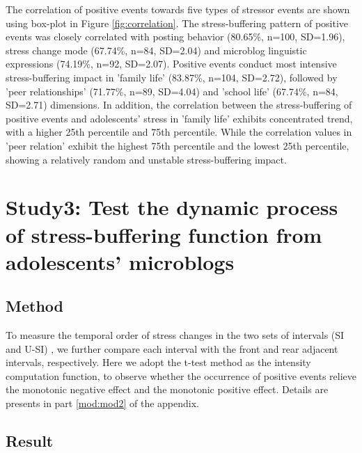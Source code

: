 The correlation of positive events towards five types of stressor events
are shown using box-plot in Figure \ref{fig:correlation}.
The stress-buffering pattern of positive events
was closely correlated with posting behavior (80.65\%, n=100, SD=1.96),
stress change mode (67.74\%, n=84, SD=2.04) and microblog linguistic expressions (74.19\%, n=92, SD=2.07).
Positive events conduct most intensive stress-buffering impact in 'family life' (83.87\%, n=104, SD=2.72),
followed by 'peer relationships' (71.77\%, n=89, SD=4.04) and 'school life' (67.74\%, n=84, SD=2.71) dimensions.
In addition,
the correlation between the stress-buffering of positive events
and adolescents' stress in 'family life'
exhibits concentrated trend,
with a higher 25th percentile and 75th percentile.
While the correlation values in 'peer relation'
exhibit the highest 75th percentile and the lowest 25th percentile,
showing a relatively random and unstable stress-buffering impact.

\section{Study3: Test the dynamic process of stress-buffering function from adolescents' microblogs}
\subsection{Method}
\label{sec:temporal}
To measure the temporal order of stress changes in the two sets of intervals (SI and U-SI) ,
we further compare each interval with the front and rear adjacent intervals, respectively.
Here we adopt the t-test method as the intensity computation function,
to observe whether the occurrence of positive events relieve the monotonic negative effect and the monotonic positive effect.
Details are presents in part \ref{mod:mod2} of the appendix.

\subsection{Result}
